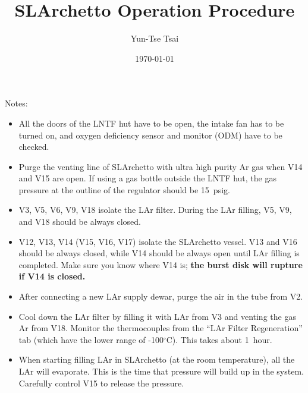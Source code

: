 \documentclass[letterpaper,11pt]{article}
\newcommand{\dC}        {$^\circ$C}
\begin{document}
\title{\textbf{SLArchetto Operation Procedure}}
\author{Yun-Tse Tsai}
\date{\today}

\maketitle


Notes:
\begin{itemize}
\setlength\itemsep{-0.2em}
\item All the doors of the LNTF hut have to be open, the intake fan has to be turned on, and oxygen deficiency sensor and monitor (ODM) have to be checked.
\item Purge the venting line of SLArchetto with ultra high purity Ar gas when V14 and V15 are open.  If using a gas bottle outside the LNTF hut, the gas pressure at the outline of the regulator should be 15~psig.
\item V3, V5, V6, V9, V18 isolate the LAr filter.  During the LAr filling, V5, V9, and V18 should be always closed.
\item V12, V13, V14 (V15, V16, V17) isolate the SLArchetto vessel.  V13 and V16 should be always closed, while V14 should be always open until LAr filling is completed.  Make sure you know where V14 is; \textbf{the burst disk will rupture if V14 is closed.}
\item After connecting a new LAr supply dewar, purge the air in the tube from V2.
\item Cool down the LAr filter by filling it with LAr from V3 and venting the gas Ar from V18.  Monitor the thermocouples from the ``LAr Filter Regeneration'' tab (which have the lower range of -100{\dC}).  This takes about 1~hour.
\item When starting filling LAr in SLArchetto (at the room temperature), all the LAr will evaporate.  This is the time that pressure will build up in the system.  Carefully control V15 to release the pressure.

\end{itemize}
\end{document}
